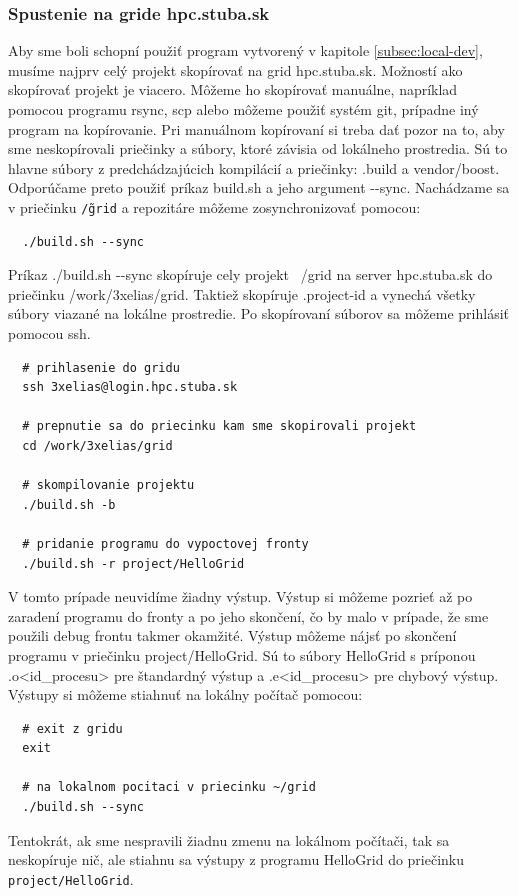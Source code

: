 \subsubsection{Spustenie na gride hpc.stuba.sk}
Aby sme boli schopní použiť program vytvorený v kapitole \ref{subsec:local-dev}, musíme najprv celý projekt skopírovať na grid hpc.stuba.sk.
Možností ako skopírovať projekt je viacero. Môžeme ho skopírovať manuálne, napríklad pomocou programu rsync, scp
alebo môžeme použiť systém git, prípadne iný program na kopírovanie.
Pri manuálnom kopírovaní si treba dať pozor na to, aby sme neskopírovali priečinky a súbory, ktoré závisia od lokálneho prostredia.
Sú to hlavne súbory z predchádzajúcich kompilácií a priečinky: .build a vendor/boost. Odporúčame preto použiť príkaz build.sh a jeho argument -{}-sync.
Nachádzame sa v priečinku \texttt{\~/grid} a repozitáre môžeme zosynchronizovať pomocou: 
\begin{lstlisting}
  ./build.sh --sync
\end{lstlisting}
Príkaz ./build.sh -{}-sync skopíruje cely projekt ~/grid na server hpc.stuba.sk do priečinku /work/3xelias/grid.
Taktiež skopíruje .project-id a vynechá všetky súbory viazané na lokálne prostredie.
Po skopírovaní súborov sa môžeme prihlásiť pomocou ssh.
\begin{lstlisting}
  # prihlasenie do gridu
  ssh 3xelias@login.hpc.stuba.sk

  # prepnutie sa do priecinku kam sme skopirovali projekt
  cd /work/3xelias/grid

  # skompilovanie projektu
  ./build.sh -b

  # pridanie programu do vypoctovej fronty
  ./build.sh -r project/HelloGrid
\end{lstlisting}
V tomto prípade neuvidíme žiadny výstup. Výstup si môžeme pozrieť až po zaradení programu do fronty a po jeho skončení, čo by malo v prípade, že sme použili debug frontu takmer okamžité. Výstup môžeme nájsť po skončení programu v priečinku project/HelloGrid. 
Sú to súbory HelloGrid s príponou .o<id\_procesu> pre štandardný výstup a .e<id\_procesu> pre chybový výstup.
Výstupy si môžeme stiahnuť na lokálny počítač pomocou:
\begin{lstlisting}
  # exit z gridu
  exit
  
  # na lokalnom pocitaci v priecinku ~/grid
  ./build.sh --sync
\end{lstlisting}
Tentokrát, ak sme nespravili žiadnu zmenu na lokálnom počítači, tak sa neskopíruje nič,
ale stiahnu sa výstupy z programu HelloGrid do priečinku \texttt{project/HelloGrid}.

